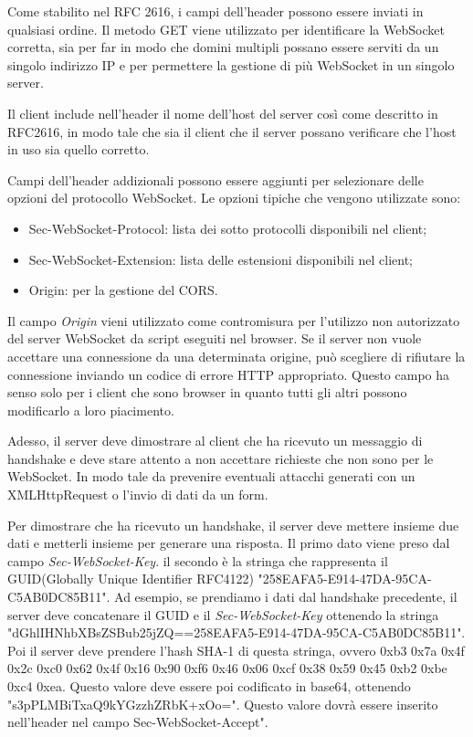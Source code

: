 Come stabilito nel RFC 2616, i campi dell'header possono essere inviati in qualsiasi ordine.  
Il metodo GET viene utilizzato per identificare la WebSocket corretta, sia per far in modo che domini multipli possano essere serviti da un singolo indirizzo IP e per permettere la gestione di più WebSocket in un singolo server.

Il client include nell'header il nome dell'host del server così come descritto in RFC2616, in modo tale che sia il client che il server
possano verificare che l'host in uso sia quello corretto.

Campi dell'header addizionali possono essere aggiunti  per selezionare
delle opzioni del protocollo WebSocket.
Le opzioni tipiche che vengono utilizzate sono:
\begin{itemize}
\item Sec-WebSocket-Protocol: lista dei sotto protocolli disponibili nel client;
\item Sec-WebSocket-Extension: lista delle estensioni disponibili nel client;
\item Origin: per la gestione del CORS.
\end{itemize}

Il campo \emph{Origin} vieni utilizzato come contromisura per 
l'utilizzo non autorizzato del server WebSocket da script eseguiti nel browser.
Se il server non vuole accettare una connessione da una determinata origine, 
può scegliere di rifiutare la connessione inviando un codice di errore HTTP appropriato.
Questo campo ha senso solo per i client che sono browser in quanto tutti gli altri possono modificarlo a loro piacimento.

Adesso, il server deve dimostrare al client che ha ricevuto un messaggio di handshake e deve stare attento a non accettare richieste che non sono per le WebSocket.
In modo tale da prevenire eventuali attacchi generati con un XMLHttpRequest o l'invio di dati da un form.

Per dimostrare che ha ricevuto un handshake, il server deve mettere insieme due dati e metterli insieme per generare una risposta.
Il primo dato viene preso dal campo \emph{Sec-WebSocket-Key}.
il secondo è la stringa che rappresenta il GUID(Globally Unique Identifier RFC4122) "258EAFA5-E914-47DA-95CA-C5AB0DC85B11".
Ad esempio, se prendiamo i dati dal handshake precedente, 
il server deve concatenare il GUID e il \emph{Sec-WebSocket-Key} ottenendo la stringa "dGhlIHNhbXBsZSBub25jZQ==258EAFA5-E914-47DA-95CA-C5AB0DC85B11".
Poi il server deve prendere l'hash SHA-1 di questa stringa, ovvero 
0xb3 0x7a 0x4f 0x2c 0xc0 0x62 0x4f 0x16 0x90 0xf6 0x46 0x06 0xcf 0x38 0x59 0x45 0xb2 0xbe 0xc4 0xea.
Questo valore deve essere poi codificato in base64, 
ottenendo "s3pPLMBiTxaQ9kYGzzhZRbK+xOo=".
Questo valore dovrà essere inserito nell'header nel campo Sec-WebSocket-Accept".

